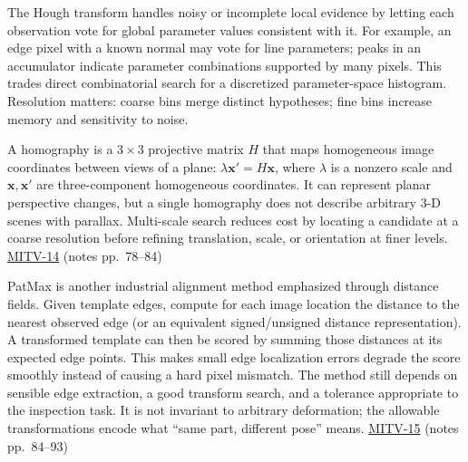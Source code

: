 The Hough transform handles noisy or incomplete local evidence by letting each observation vote for global parameter values consistent with it. For example, an edge pixel with a known normal may vote for line parameters; peaks in an accumulator indicate parameter combinations supported by many pixels. This trades direct combinatorial search for a discretized parameter-space histogram. Resolution matters: coarse bins merge distinct hypotheses; fine bins increase memory and sensitivity to noise.

A homography is a \(3\times3\) projective matrix \(H\) that maps homogeneous image coordinates between views of a plane: \(\lambda\mathbf{x}'=H\mathbf{x}\), where \(\lambda\) is a nonzero scale and \(\mathbf{x},\mathbf{x}'\) are three-component homogeneous coordinates. It can represent planar perspective changes, but a single homography does not describe arbitrary 3-D scenes with parallax. Multi-scale search reduces cost by locating a candidate at a coarse resolution before refining translation, scale, or orientation at finer levels. \hyperref[04-visual-computing-ii-ch036-mitv-14---inspection-in-patquick-hough-transform-homography-position-determination-multi-scale]{MITV-14} (notes pp.~78--84)

PatMax is another industrial alignment method emphasized through distance fields. Given template edges, compute for each image location the distance to the nearest observed edge (or an equivalent signed/unsigned distance representation). A transformed template can then be scored by summing those distances at its expected edge points. This makes small edge localization errors degrade the score smoothly instead of causing a hard pixel mismatch. The method still depends on sensible edge extraction, a good transform search, and a tolerance appropriate to the inspection task. It is not invariant to arbitrary deformation; the allowable transformations encode what ``same part, different pose'' means. \hyperref[04-visual-computing-ii-ch036-mitv-15---alignment-patmax-distance-field-filtering-and-sub-sampling-us-7065262]{MITV-15} (notes pp.~84--93)


